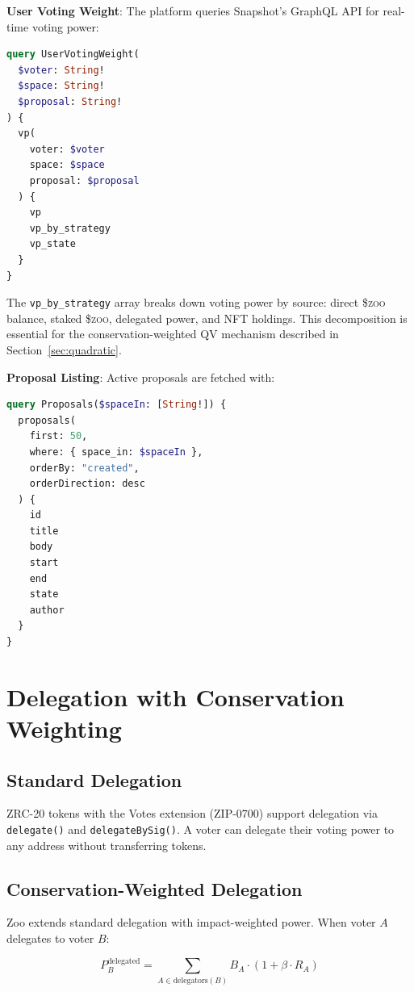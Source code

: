\documentclass[11pt,letterpaper]{article}
\newcommand{\ZOO}{\$\textsc{zoo}}
\begin{document}
\textbf{User Voting Weight}: The platform queries Snapshot's GraphQL API for real-time voting power:

\begin{lstlisting}[language=GraphQL,caption=User voting weight query]
query UserVotingWeight(
  $voter: String!
  $space: String!
  $proposal: String!
) {
  vp(
    voter: $voter
    space: $space
    proposal: $proposal
  ) {
    vp
    vp_by_strategy
    vp_state
  }
}
\end{lstlisting}

The \texttt{vp\_by\_strategy} array breaks down voting power by source: direct \ZOO{} balance, staked \ZOO{}, delegated power, and NFT holdings. This decomposition is essential for the conservation-weighted QV mechanism described in Section~\ref{sec:quadratic}.

\textbf{Proposal Listing}: Active proposals are fetched with:

\begin{lstlisting}[language=GraphQL,caption=Active proposals query]
query Proposals($spaceIn: [String!]) {
  proposals(
    first: 50,
    where: { space_in: $spaceIn },
    orderBy: "created",
    orderDirection: desc
  ) {
    id
    title
    body
    start
    end
    state
    author
  }
}
\end{lstlisting}

\section{Delegation with Conservation Weighting}
\label{sec:delegation}

\subsection{Standard Delegation}

ZRC-20 tokens with the Votes extension (ZIP-0700) support delegation via \texttt{delegate()} and \texttt{delegateBySig()}. A voter can delegate their voting power to any address without transferring tokens.

\subsection{Conservation-Weighted Delegation}

Zoo extends standard delegation with impact-weighted power. When voter $A$ delegates to voter $B$:

\begin{equation}
P_B^{\text{delegated}} = \sum_{A \in \text{delegators}(B)} B_A \cdot (1 + \beta \cdot R_A)
\end{equation}
\end{document}
